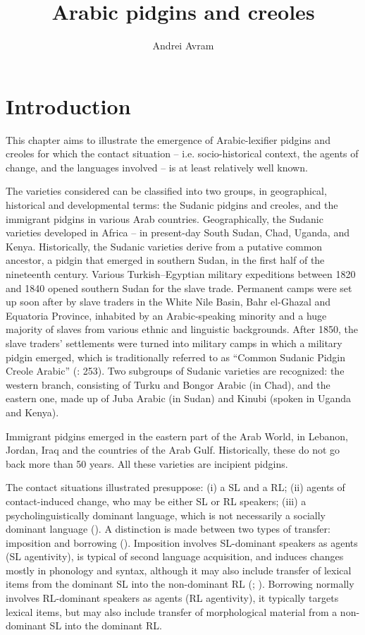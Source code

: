 \documentclass[output=paper]{langsci/langscibook}
\author{Andrei Avram\affiliation{University of Bucharest}}
\title{Arabic pidgins and creoles}
\begin{document}
\maketitle 


\section{Introduction}

This chapter aims to illustrate the emergence of Arabic-lexifier pidgins and creoles for which the contact situation – i.e. socio-historical context, the agents of change, and the languages involved – is at least relatively well known.

  The varieties considered can be classified into two groups, in geographical, historical and developmental terms: the Sudanic pidgins and creoles, and the immigrant pidgins in various Arab countries. Geographically, the Sudanic varieties developed in Africa – in present-day South Sudan, Chad, Uganda, and Kenya. Historically, the Sudanic varieties derive from a putative common ancestor, a pidgin that emerged in southern Sudan, in the first half of the nineteenth century. Various Turkish--Egyptian military expeditions between 1820 and 1840 opened southern Sudan for the slave trade. Permanent camps were set up soon after by slave traders in the White Nile Basin, Bahr el-Ghazal and Equatoria Province, inhabited by an Arabic-speaking minority and a huge majority of slaves from various ethnic and linguistic backgrounds. After 1850, the slave traders’ settlements were turned into military camps in which a military pidgin emerged, which is traditionally referred to as “Common Sudanic Pidgin Creole Arabic” (\citealt{ToscoManfredi2013}: 253). Two subgroups of Sudanic varieties are recognized: the western branch, consisting of Turku and Bongor Arabic (in Chad), and the eastern one, made up of Juba Arabic (in Sudan) and Kinubi (spoken in Uganda and Kenya). 

  Immigrant pidgins emerged in the eastern part of the Arab World, in Lebanon, Jordan, Iraq and the countries of the Arab Gulf. Historically, these do not go back more than 50 years. All these varieties are incipient pidgins.

  The contact situations illustrated presuppose: (i) a SL and a RL; (ii) agents of contact-induced change, who may be either SL or RL speakers; (iii) a psycholinguistically dominant language, which is not necessarily a socially dominant language (\citealt{VanCoetsem1988,VanCoetsem1995,VanCoetsem2000,VanCoetsem2003,Winford2005,Winford2008}). A distinction is made between two types of transfer: imposition and borrowing (\citealt{VanCoetsem1988,VanCoetsem2000,VanCoetsem2003}). Imposition involves SL-dominant speakers as agents (SL agentivity), is typical of second language acquisition, and induces changes mostly in phonology and syntax, although it may also include transfer of lexical items from the dominant SL into the non-dominant RL (\citealt[18]{VanCoetsem1995}; \citealt[376]{Winford2005}). Borrowing normally involves RL-dominant speakers as agents (RL agentivity), it typically targets lexical items, but may also include transfer of morphological material from a non-dominant SL into the dominant RL.
\end{document}
